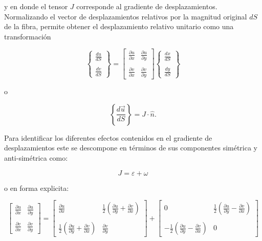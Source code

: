 \documentclass[../notas medios.tex]{subfiles}
\begin{document}
y en donde el tensor $J$ corresponde al gradiente de desplazamientos. Normalizando el vector de desplazamientos relativos por la magnitud original $dS$ de la fibra, permite obtener el desplazamiento relativo unitario como una transformación

\[\left\{ {\begin{array}{*{20}{c}}
{\frac{{du}}{{dS}}}\\\\
{\frac{{dv}}{{dS}}}
\end{array}} \right\} = \left[ {\begin{array}{*{20}{c}}
{\frac{{\partial u}}{{\partial x}}}&{\frac{{\partial u}}{{\partial y}}}\\\\
{\frac{{\partial v}}{{\partial x}}}&{\frac{{\partial v}}{{\partial y}}}
\end{array}} \right]\left\{ {\begin{array}{*{20}{c}}
{\frac{{dx}}{{dS}}}\\\\
{\frac{{dy}}{{dS}}}
\end{array}} \right\}\]

o

\begin{equation}
\left\{ {\frac{{d\vec u}}{{dS}}} \right\} = J \cdot \hat n.
\label{trans}
\end{equation}

Para identificar los diferentes efectos contenidos en el gradiente de desplazamientos este se descompone en términos de sus componentes simétrica y anti-simétrica como:


\[J = \varepsilon  + \omega \]

o en forma explicita:

\[\left[ {\begin{array}{*{20}{c}}
{\frac{{\partial u}}{{\partial x}}}&{\frac{{\partial u}}{{\partial y}}}\\\\
{\frac{{\partial v}}{{\partial x}}}&{\frac{{\partial v}}{{\partial y}}}
\end{array}} \right] = \left[ {\begin{array}{*{20}{c}}
{\frac{{\partial u}}{{\partial x}}}&{\frac{1}{2}\left( {\frac{{\partial u}}{{\partial y}} + \frac{{\partial v}}{{\partial x}}} \right)}\\\\
{\frac{1}{2}\left( {\frac{{\partial u}}{{\partial y}} + \frac{{\partial v}}{{\partial x}}} \right)}&{\frac{{\partial v}}{{\partial y}}}
\end{array}} \right] + \left[ {\begin{array}{*{20}{c}}
0&{\frac{1}{2}\left( {\frac{{\partial u}}{{\partial y}} - \frac{{\partial v}}{{\partial x}}} \right)}\\\\
{ - \frac{1}{2}\left( {\frac{{\partial u}}{{\partial y}} - \frac{{\partial v}}{{\partial x}}} \right)}&0
\end{array}} \right]\]
\end{document}
